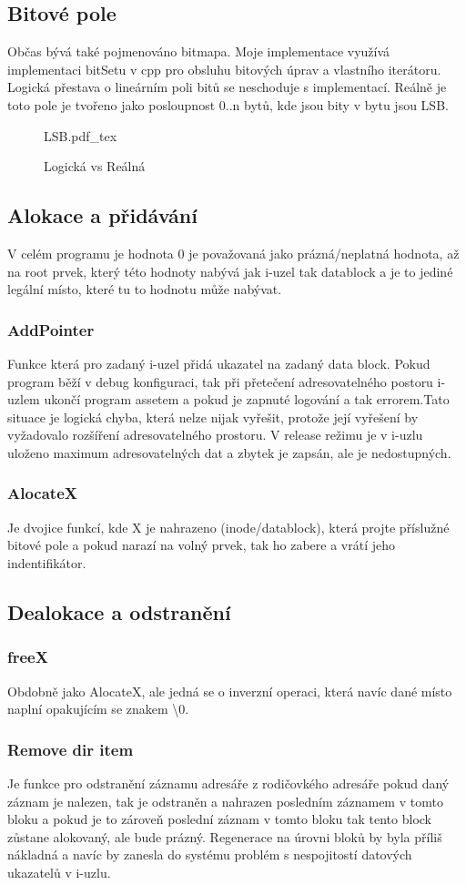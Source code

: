 \documentclass[12pt, a4paper]{report}
\newcommand{\incfig}[1]{%
    \def\svgwidth{\columnwidth}
    {#1.pdf_tex}
}
\begin{document}
\subsection{Bitové pole}
Občas bývá také pojmenováno bitmapa. Moje implementace využívá implementaci bitSetu v cpp pro obsluhu bitových úprav a vlastního iterátoru. Logická přestava o lineárním poli bitů se neschoduje s implementací. Reálně je toto pole je tvořeno jako posloupnost 0..n bytů, kde jsou bity v bytu jsou LSB.
\begin{figure}[H]
 \centering
 \incfig{LSB}
 \caption{Logická vs Reálná}
\end{figure}
\subsection{Alokace a přidávání}
V celém programu je hodnota 0 je považovaná jako prázná/neplatná hodnota, až na root prvek, který této hodnoty nabývá jak i-uzel tak datablock a je to jediné legální místo, které tu to hodnotu může nabývat.
\subsubsection{AddPointer}
Funkce která pro zadaný i-uzel přidá ukazatel na zadaný data block. Pokud program běží v debug konfiguraci, tak při přetečení adresovatelného postoru i-uzlem ukončí program assetem a pokud je zapnuté logování a tak errorem.Tato situace je logická chyba, která nelze nijak vyřešit, protože její vyřešení by vyžadovalo rozšíření adresovatelného prostoru. V release režimu je v i-uzlu uloženo maximum adresovatelných dat a zbytek je zapsán, ale je nedostupných.
\subsubsection{AlocateX}
Je dvojice funkcí, kde X je nahrazeno (inode/datablock), která projte příslužné bitové pole a pokud narazí na volný prvek, tak ho zabere a vrátí jeho indentifikátor.
\subsection{Dealokace a odstranění}
\subsubsection{freeX}
Obdobně jako AlocateX, ale jedná se o inverzní operaci, která navíc dané místo naplní opakujícím se znakem \textbackslash0.
\subsubsection{Remove dir item}
Je funkce pro odstranění záznamu adresáře z rodičovkého adresáře pokud daný záznam je nalezen, tak je odstraněn a nahrazen posledním záznamem v tomto bloku a pokud je to zároveň poslední záznam v tomto bloku tak tento block zůstane alokovaný, ale bude prázný. Regenerace na úrovni bloků by byla příliš nákladná a navíc by zanesla do systému problém s nespojitostí datových ukazatelů v i-uzlu.
\end{document}
